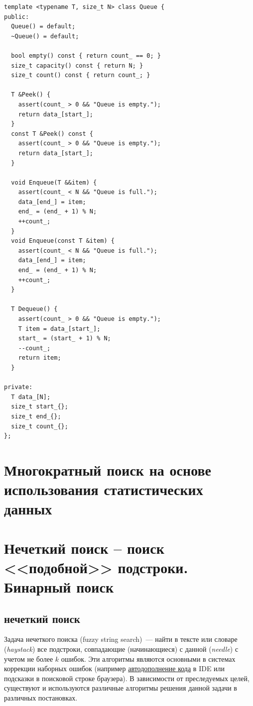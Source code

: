 \begin{verbatim}
template <typename T, size_t N> class Queue {
public:
  Queue() = default;
  ~Queue() = default;

  bool empty() const { return count_ == 0; }
  size_t capacity() const { return N; }
  size_t count() const { return count_; }

  T &Peek() {
    assert(count_ > 0 && "Queue is empty.");
    return data_[start_];
  }
  const T &Peek() const {
    assert(count_ > 0 && "Queue is empty.");
    return data_[start_];
  }

  void Enqueue(T &&item) {
    assert(count_ < N && "Queue is full.");
    data_[end_] = item;
    end_ = (end_ + 1) % N;
    ++count_;
  }
  void Enqueue(const T &item) {
    assert(count_ < N && "Queue is full.");
    data_[end_] = item;
    end_ = (end_ + 1) % N;
    ++count_;
  }

  T Dequeue() {
    assert(count_ > 0 && "Queue is empty.");
    T item = data_[start_];
    start_ = (start_ + 1) % N;
    --count_;
    return item;
  }

private:
  T data_[N];
  size_t start_{};
  size_t end_{};
  size_t count_{};
};
\end{verbatim}

%
%

\section{Многократный поиск на основе использования статистических данных}

%
%

\section{Нечеткий поиск – поиск <<подобной>> подстроки. Бинарный поиск}

\subsection{нечеткий поиск}
Задача нечеткого поиска (fuzzy string search)~--- найти в тексте или словаре (\textit{haystack}) все подстроки, совпадающие
(начинающиеся) с данной (\textit{needle}) с учетом не более \(k\) ошибок.
Эти алгоритмы являются основными в системах коррекции наборных ошибок
(например \href{https://en.wikipedia.org/wiki/Code_completion}{автодополнение кода} в IDE или подсказки в поисковой строке браузера).
В зависимости от преследуемых целей, существуют и используются различные алгоритмы решения данной задачи в различных постановках.

